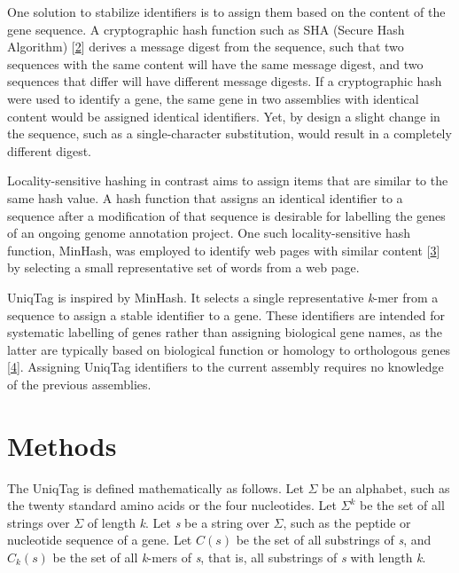 \documentclass[10pt]{article}
\begin{document}
One solution to stabilize identifiers is to assign them based on the
content of the gene sequence. A cryptographic hash function such as SHA
(Secure Hash Algorithm)
{[}\href{http://www.nist.gov/manuscript-publication-search.cfm?pub_id=910977}{2}{]}
derives a message digest from the sequence, such that two sequences with
the same content will have the same message digest, and two sequences
that differ will have different message digests. If a cryptographic hash
were used to identify a gene, the same gene in two assemblies with
identical content would be assigned identical identifiers. Yet, by
design a slight change in the sequence, such as a single-character
substitution, would result in a completely different digest.

Locality-sensitive hashing in contrast aims to assign items that are
similar to the same hash value. A hash function that assigns an
identical identifier to a sequence after a modification of that sequence
is desirable for labelling the genes of an ongoing genome annotation
project. One such locality-sensitive hash function, MinHash, was
employed to identify web pages with similar content
{[}\href{http://dx.doi.org/10.1109/SEQUEN.1997.666900}{3}{]} by
selecting a small representative set of words from a web page.

UniqTag is inspired by MinHash. It selects a single representative
\emph{k}-mer from a sequence to assign a stable identifier to a gene.
These identifiers are intended for systematic labelling of genes rather
than assigning biological gene names, as the latter are typically based
on biological function or homology to orthologous genes
{[}\href{http://dx.doi.org/10.1006/geno.2002.6748}{4}{]}. Assigning
UniqTag identifiers to the current assembly requires no knowledge of the
previous assemblies.

\section{Methods}\label{methods}

The UniqTag is defined mathematically as follows. Let \(\Sigma\) be an
alphabet, such as the twenty standard amino acids or the four
nucleotides. Let \(\Sigma^k\) be the set of all strings over \(\Sigma\)
of length \emph{k}. Let \emph{s} be a string over \(\Sigma\), such as
the peptide or nucleotide sequence of a gene. Let \(C(s)\) be the set of
all substrings of \emph{s}, and \(C_k(s)\) be the set of all
\emph{k}-mers of \emph{s}, that is, all substrings of \emph{s} with
length \emph{k}.
\end{document}
